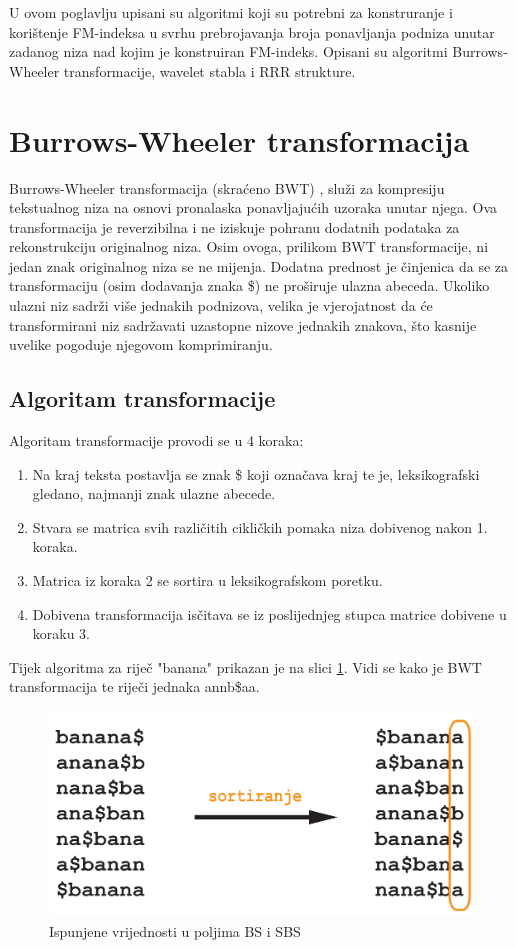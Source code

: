 U ovom poglavlju upisani su algoritmi koji su potrebni za konstruranje i korištenje FM-indeksa u svrhu prebrojavanja broja ponavljanja podniza unutar zadanog niza nad kojim je konstruiran FM-indeks. Opisani su algoritmi Burrows-Wheeler transformacije, wavelet stabla i RRR strukture.


\section{Burrows-Wheeler transformacija}
Burrows-Wheeler transformacija (skraćeno BWT) \cite{bwt1}, služi za kompresiju tekstualnog niza na osnovi pronalaska ponavljajućih uzoraka unutar njega. Ova transformacija je reverzibilna i ne iziskuje pohranu dodatnih podataka za rekonstrukciju originalnog niza. Osim ovoga, prilikom BWT transformacije, ni jedan znak originalnog niza se ne mijenja. Dodatna prednost je činjenica da se za transformaciju (osim dodavanja znaka \$) ne proširuje ulazna abeceda. Ukoliko ulazni niz sadrži više jednakih podnizova, velika je vjerojatnost da će transformirani niz sadržavati uzastopne nizove jednakih znakova, što kasnije uvelike pogoduje njegovom komprimiranju.

\subsection{Algoritam transformacije}
Algoritam transformacije provodi se u 4 koraka:

\begin{enumerate}
  \item Na kraj teksta postavlja se znak \$ koji označava kraj te je, leksikografski gledano, najmanji znak ulazne abecede.
  \item Stvara se matrica svih različitih cikličkih pomaka niza dobivenog nakon 1. koraka.
  \item Matrica iz koraka 2 se sortira u leksikografskom poretku.
  \item Dobivena transformacija isčitava se iz poslijednjeg stupca matrice dobivene u koraku 3.

\end{enumerate}

Tijek algoritma za riječ "banana" prikazan je na slici \ref{bwt1}. Vidi se kako je BWT transformacija te riječi jednaka annb\$aa. 


\begin{figure}[H]
\centering
\includegraphics[scale=0.2]{./pictures/bwt.jpg}
\caption{Ispunjene vrijednosti u poljima BS i SBS}\label{bwt1}
\end{figure}

